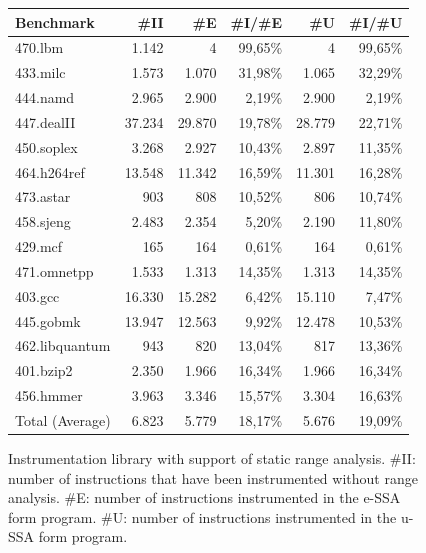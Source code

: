 \documentclass[preprint]{sigplanconf}[10pt]
\begin{document}
\begin{figure}[t!]
\begin{center}
\begin{small}
\begin{tabular*}{\columnwidth}{@{\extracolsep{\fill}}|l|r|r|r|r|r|}
\hline
Benchmark & \#II & \#E & \#I/\#E & \#U &
\#I/\#U \\ \hline
470.lbm & 1.142 & 4 & 99,65\% & 4 & 99,65\% \\ \hline
433.milc & 1.573 & 1.070 & 31,98\% & 1.065 & 32,29\% \\ \hline
444.namd & 2.965 & 2.900 & 2,19\% & 2.900 & 2,19\% \\ \hline
447.dealII & 37.234 & 29.870 & 19,78\% & 28.779 & 22,71\% \\ \hline
450.soplex & 3.268 & 2.927 & 10,43\% & 2.897 & 11,35\% \\ \hline
464.h264ref & 13.548 & 11.342 & 16,59\% & 11.301 & 16,28\% \\ \hline
473.astar & 903 & 808 & 10,52\% & 806 & 10,74\% \\ \hline
458.sjeng & 2.483 & 2.354 & 5,20\% & 2.190 & 11,80\% \\ \hline
429.mcf & 165 & 164 & 0,61\% & 164 & 0,61\% \\ \hline
471.omnetpp & 1.533 & 1.313 & 14,35\% & 1.313 & 14,35\% \\ \hline
403.gcc & 16.330 & 15.282 & 6,42\% & 15.110 & 7,47\% \\ \hline
445.gobmk & 13.947 & 12.563 & 9,92\% & 12.478 & 10,53\% \\ \hline
462.libquantum & 943 & 820 & 13,04\% & 817 & 13,36\% \\ \hline
401.bzip2 & 2.350 & 1.966 & 16,34\% & 1.966 & 16,34\% \\ \hline
456.hmmer & 3.963 & 3.346 & 15,57\% & 3.304 & 16,63\% \\ \hline
Total (Average) & 6.823 & 5.779 & 18,17\% & 5.676 & 19,09\% \\ \hline
\end{tabular*}
\end{small}
\end{center}
\caption{\label{fig:prunningTable}
Instrumentation library with support of static range analysis.
\#II: number of instructions that have been instrumented without range
analysis.
\#E: number of instructions instrumented in the e-SSA form program.
\#U: number of instructions instrumented in the u-SSA form program.}
\end{figure}
\end{document}
